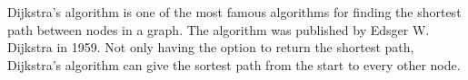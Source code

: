 Dijkstra's algorithm is one of the most famous algorithms for finding the shortest path between nodes in a graph. The algorithm was published by Edsger W. Dijkstra in 1959. Not only having the option to return the shortest path, Dijkstra's algorithm can give the sortest path from the start to every other node.